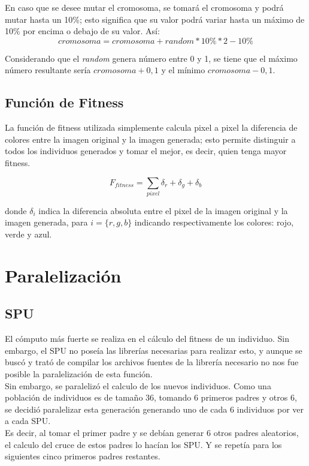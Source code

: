 \documentclass[11pt, spanish]{article}
\begin{document}
En caso que se desee mutar el cromosoma, se tomará el cromosoma y
podrá mutar hasta un 10\%; esto significa que su valor podrá variar
hasta un máximo de 10\% por encima o debajo de su valor. Así:
$$ cromosoma = cromosoma + random * 10\% * 2 - 10\% $$

Considerando que el \emph{random} genera número entre 0 y 1, se tiene
que el máximo número resultante sería $cromosoma + 0,1$ y el mínimo
$cromosoma - 0,1$.

\subsection{Función de Fitness}
\label{subsec:fitness}
La función de fitness utilizada simplemente calcula pixel a pixel la
diferencia de colores entre la imagen original y la imagen generada;
esto permite distinguir a todos los individuos generados y tomar el
mejor, es decir, quien tenga mayor fitness.

$$ F_{fitness} = \displaystyle\sum_{pixel} \delta_r + \delta_g + \delta_b $$

donde $\delta_i$ indica la diferencia absoluta entre el pixel de la
imagen original y la imagen generada, para $i = \{r, g, b\}$ indicando
respectivamente los colores: rojo, verde y azul.

\section{Paralelización}
\subsection{SPU}
El cómputo más fuerte se realiza en el cálculo del fitness de un
individuo. Sin embargo, el SPU no poseía las librerías necesarias para
realizar esto, y aunque se buscó y trató de compilar los archivos
fuentes de la librería necesario no nos fue posible la paralelización
de esta función.\\

Sin embargo, se paralelizó el calculo de los nuevos individuos. Como
una población de individuos es de tamaño 36, tomando 6 primeros padres
y otros 6, se decidió paralelizar esta generación generando uno de
cada 6 individuos por ver a cada SPU.\\

Es decir, al tomar el primer padre y se debían generar 6 otros padres
aleatorios, el calculo del cruce de estos padres lo hacían los SPU. Y
se repetía para los siguientes cinco primeros padres restantes.
\end{document}
